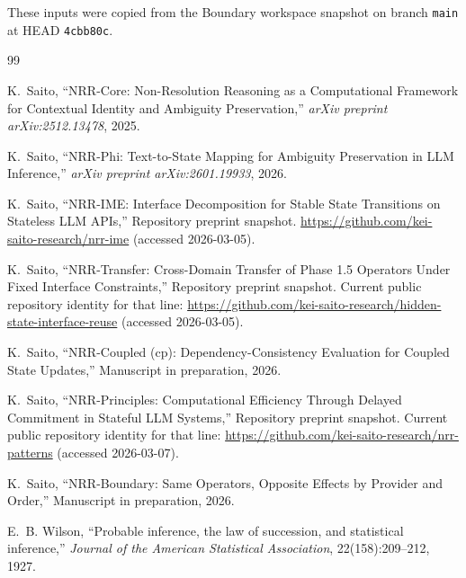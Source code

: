 \documentclass[11pt,a4paper]{article}
\begin{document}
These inputs were copied from the Boundary workspace snapshot on branch \texttt{main} at HEAD \texttt{4cbb80c}.

\begin{thebibliography}{99}
\raggedright

K.~Saito,
\newblock ``NRR-Core: Non-Resolution Reasoning as a Computational Framework for Contextual Identity and Ambiguity Preservation,''
\newblock \emph{arXiv preprint arXiv:2512.13478}, 2025.

K.~Saito,
\newblock ``NRR-Phi: Text-to-State Mapping for Ambiguity Preservation in LLM Inference,''
\newblock \emph{arXiv preprint arXiv:2601.19933}, 2026.

K.~Saito,
\newblock ``NRR-IME: Interface Decomposition for Stable State Transitions on Stateless LLM APIs,''
\newblock Repository preprint snapshot. \url{https://github.com/kei-saito-research/nrr-ime} (accessed 2026-03-05).

K.~Saito,
\newblock ``NRR-Transfer: Cross-Domain Transfer of Phase 1.5 Operators Under Fixed Interface Constraints,''
\newblock Repository preprint snapshot. Current public repository identity for that line: \url{https://github.com/kei-saito-research/hidden-state-interface-reuse} (accessed 2026-03-05).

K.~Saito,
\newblock ``NRR-Coupled (cp): Dependency-Consistency Evaluation for Coupled State Updates,''
\newblock Manuscript in preparation, 2026.

K.~Saito,
\newblock ``NRR-Principles: Computational Efficiency Through Delayed Commitment in Stateful LLM Systems,''
\newblock Repository preprint snapshot. Current public repository identity for that line: \url{https://github.com/kei-saito-research/nrr-patterns} (accessed 2026-03-07).

K.~Saito,
\newblock ``NRR-Boundary: Same Operators, Opposite Effects by Provider and Order,''
\newblock Manuscript in preparation, 2026.

E.~B. Wilson,
\newblock ``Probable inference, the law of succession, and statistical inference,''
\newblock \emph{Journal of the American Statistical Association}, 22(158):209--212, 1927.

\end{thebibliography}
\end{document}
